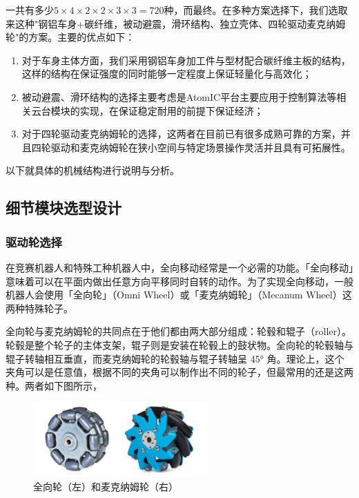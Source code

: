 一共有多少$ 5 \times 4 \times 2 \times 2 \times 3 \times 3 =720 $种，而最终。在多种方案选择下，我们选取来这种"钢铝车身+碳纤维，被动避震，滑环结构、独立壳体、四轮驱动麦克纳姆轮"的方案。主要的优点如下：

\begin{enumerate}
	\item 对于车身主体方面，我们采用钢铝车身加工件与型材配合碳纤维主板的结构，这样的结构在保证强度的同时能够一定程度上保证轻量化与高效化；
	\item 被动避震、滑环结构的选择主要考虑是AtomIC平台主要应用于控制算法等相关云台模块的实现，在保证稳定耐用的前提下保证经济；
	\item 对于四轮驱动麦克纳姆轮的选择，这两者在目前已有很多成熟可靠的方案，并且四轮驱动和麦克纳姆轮在狭小空间与特定场景操作灵活并且具有可拓展性。
	
\end{enumerate}

以下就具体的机械结构进行说明与分析。

\subsection{细节模块选型设计}

\subsubsection{驱动轮选择}

在竞赛机器人和特殊工种机器人中，全向移动经常是一个必需的功能。「全向移动」意味着可以在平面内做出任意方向平移同时自转的动作。为了实现全向移动，一般机器人会使用「全向轮」（Omni Wheel）或「麦克纳姆轮」（Mecanum Wheel）这两种特殊轮子。

全向轮与麦克纳姆轮的共同点在于他们都由两大部分组成：轮毂和辊子（roller）。轮毂是整个轮子的主体支架，辊子则是安装在轮毂上的鼓状物。全向轮的轮毂轴与辊子转轴相互垂直，而麦克纳姆轮的轮毂轴与辊子转轴呈 45° 角。理论上，这个夹角可以是任意值，根据不同的夹角可以制作出不同的轮子，但最常用的还是这两种。两者如下图所示，

\begin{figure}[htbp]
	\centering
	\includegraphics[width = 0.6\textwidth]{fig/qxlml.png}
	\caption{全向轮（左）和麦克纳姆轮（右）}
	\label{qxlml}
\end{figure}

